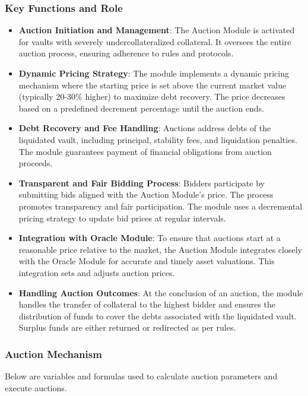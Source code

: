 \subsubsection{Key Functions and Role}
\begin{itemize}
    \item \textbf{Auction Initiation and Management}: The Auction Module is activated for vaults with severely undercollateralized collateral. It oversees the entire auction process, ensuring adherence to rules and protocols.
    \item \textbf{Dynamic Pricing Strategy}: The module implements a dynamic pricing mechanism where the starting price is set above the current market value (typically 20-30\% higher) to maximize debt recovery. The price decreases based on a predefined decrement percentage until the auction ends.
    \item \textbf{Debt Recovery and Fee Handling}: Auctions address debts of the liquidated vault, including principal, stability fees, and liquidation penalties. The module guarantees payment of financial obligations from auction proceeds.
    \item \textbf{Transparent and Fair Bidding Process}: Bidders participate by submitting bids aligned with the Auction Module's price. The process promotes transparency and fair participation. The module uses a decremental pricing strategy to update bid prices at regular intervals.
    \item \textbf{Integration with Oracle Module}: To ensure that auctions start at a reasonable price relative to the market, the Auction Module integrates closely with the Oracle Module for accurate and timely asset valuations. This integration sets and adjusts auction prices.
    \item \textbf{Handling Auction Outcomes}: At the conclusion of an auction, the module handles the transfer of collateral to the highest bidder and ensures the distribution of funds to cover the debts associated with the liquidated vault. Surplus funds are either returned or redirected as per rules.
\end{itemize}

\subsubsection{Auction Mechanism}
Below are variables and formulas used to calculate auction parameters and execute auctions.\\

